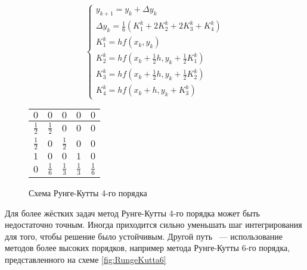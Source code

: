 \begin{figure}
\begin{minipage}[t]{8.5cm}
    {\small
    \begin{equation*}
        \begin{cases}
            y_{k + 1} = y_k + \Delta y_k\\
            \Delta y_k = \frac{1}{6} (K_1^k + 2K_2^k + 2K_3^k + K_4^k)\\
            K_1^k = hf(x_k, y_k)\\
            K_2^k = hf(x_k + \frac{1}{2}h, y_k + \frac{1}{2}K_1^k)\\
            K_3^k = hf(x_k + \frac{1}{2}h, y_k + \frac{1}{2}K_2^k)\\
            K_4^k = hf(x_k + h, y_k + K_3^k)
        \end{cases}
    \end{equation*}
    }
\end{minipage}
\begin{minipage}[t]{7.5cm}
    \begin{table}    
        \begin{tabular}{|c|c|c|c|c|}
        \hline
        $0$ & $0$ & $0$ & $0$ & $0$\\
        \hline
        $\frac{1}{2}$ & $\frac{1}{2}$ & $0$ & $0$ & $0$\\
        \hline
        $\frac{1}{2}$ & $0$ & $\frac{1}{2}$ & $0$ & $0$\\
        \hline
        $1$ & $0$ & $0$ & $1$ & $0$\\
        \hline
        $0$ & \cellcolor{lightgray} $\frac{1}{6}$ & \cellcolor{lightgray} $\frac{1}{3}$ & \cellcolor{lightgray} $\frac{1}{3}$ & \cellcolor{lightgray} $\frac{1}{6}$\\
        \hline
        \end{tabular}
    \end{table}
\end{minipage}
\caption{Схема Рунге-Кутты 4-го порядка}
\label{fig:RungeKutta4}
\end{figure}

Для более жёстких задач метод Рунге-Кутты 4-го порядка может быть недостаточно точным. Иногда приходится сильно уменьшать шаг
интегрирования для того, чтобы решение было устойчивым. Другой путь ~--- использование методов более высоких порядков, например метода
Рунге-Кутты 6-го порядка, представленного на схеме \ref{fig:RungeKutta6}

